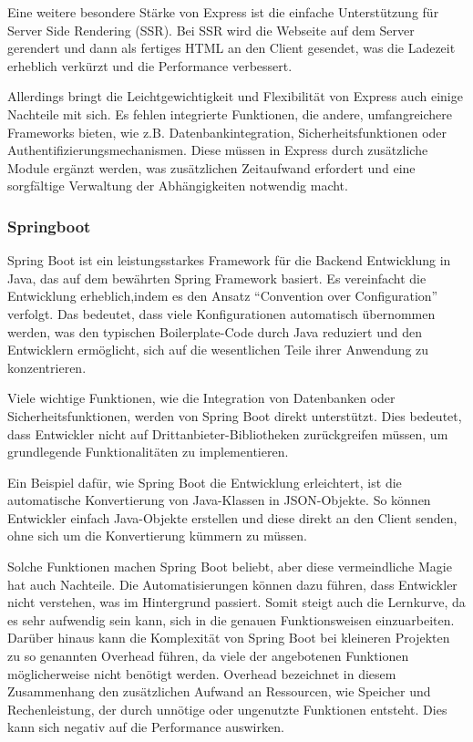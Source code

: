 \documentclass[biblatex]{lni}
\begin{document}
Eine weitere besondere Stärke von Express ist die einfache Unterstützung für Server Side Rendering (SSR).
Bei SSR wird die Webseite auf dem Server gerendert und dann als fertiges HTML an den Client gesendet,
was die Ladezeit erheblich verkürzt und die Performance verbessert.

Allerdings bringt die Leichtgewichtigkeit und Flexibilität von Express auch einige Nachteile mit sich.
Es fehlen integrierte Funktionen, die andere, umfangreichere Frameworks bieten,
wie z.B. Datenbankintegration, Sicherheitsfunktionen oder Authentifizierungsmechanismen.
Diese müssen in Express durch zusätzliche Module ergänzt werden,
was zusätzlichen Zeitaufwand erfordert und eine sorgfältige Verwaltung der Abhängigkeiten notwendig macht.

\subsubsection{Springboot}

Spring Boot ist ein leistungsstarkes Framework für die Backend Entwicklung in Java,
das auf dem bewährten Spring Framework basiert.
Es vereinfacht die Entwicklung erheblich,indem es den Ansatz “Convention over Configuration” verfolgt.
Das bedeutet, dass viele Konfigurationen automatisch übernommen werden,
was den typischen Boilerplate-Code durch Java reduziert und den Entwicklern ermöglicht,
sich auf die wesentlichen Teile ihrer Anwendung zu konzentrieren.

Viele wichtige Funktionen, wie die Integration von Datenbanken oder Sicherheitsfunktionen,
werden von Spring Boot direkt unterstützt.
Dies bedeutet, dass Entwickler nicht auf Drittanbieter-Bibliotheken zurückgreifen müssen,
um grundlegende Funktionalitäten zu implementieren.

Ein Beispiel dafür, wie Spring Boot die Entwicklung erleichtert, ist die automatische Konvertierung von Java-Klassen in JSON-Objekte.
So können Entwickler einfach Java-Objekte erstellen und diese direkt an den Client senden, ohne sich um die Konvertierung kümmern zu müssen.

Solche Funktionen machen Spring Boot beliebt, aber diese vermeindliche Magie hat auch Nachteile.
Die Automatisierungen können dazu führen, dass Entwickler nicht verstehen, was im Hintergrund passiert.
Somit steigt auch die Lernkurve, da es sehr aufwendig sein kann, sich in die genauen Funktionsweisen einzuarbeiten.
Darüber hinaus kann die Komplexität von Spring Boot bei kleineren Projekten zu so genannten Overhead führen,
da viele der angebotenen Funktionen möglicherweise nicht benötigt werden.
Overhead bezeichnet in diesem Zusammenhang den zusätzlichen Aufwand an Ressourcen,
wie Speicher und Rechenleistung, der durch unnötige oder ungenutzte Funktionen entsteht.
Dies kann sich negativ auf die Performance auswirken.
\end{document}
